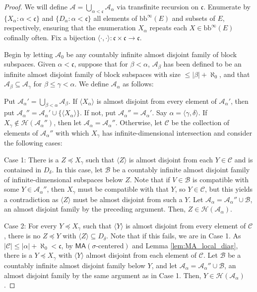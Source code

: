 \documentclass[11pt]{amsart}
\newcommand{\LC}{\mathcal{C}}
\newcommand{\LA}{\mathcal{A}}
\newcommand{\LB}{\mathcal{B}}
\theoremstyle{definition}
\theoremstyle{remark}
\newcommand{\LH}{\mathcal{H}}
\newcommand{\MA}{\mathsf{MA}}
\newcommand{\bb}{\mathrm{bb}}
\renewcommand{\1}{\mathbf{1}}
\newcommand{\cc}{\mathfrak{c}}
\begin{document}
\begin{proof}
	We will define $\LA=\bigcup_{\alpha<\cc}\LA_\alpha$ via transfinite recursion on $\cc$. Enumerate by $\{X_\alpha:\alpha<\cc\}$ and $\{D_\alpha:\alpha<\cc\}$ all elements of $\bb^\infty(E)$ and subsets of $E$, respectively, ensuring that the enumeration $X_\alpha$ repeats each $X\in\bb^\infty(E)$ cofinally often. Fix a bijection $\langle\cdot,\cdot\rangle:\cc\times\cc\to\cc$. 
	
	Begin by letting $\LA_0$ be any countably infinite almost disjoint family of block subspaces. Given $\alpha<\cc$, suppose that for $\beta<\alpha$, $\LA_\beta$ has been defined to be an infinite almost disjoint family of block subspaces with size $\leq|\beta|+\aleph_0$, and that $\LA_\beta\subseteq\LA_\gamma$ for $\beta\leq\gamma<\alpha$. We define $\LA_\alpha$ as follows:
	
	Put $\LA_\alpha'=\bigcup_{\beta<\alpha}\LA_\beta$. If $\langle X_\alpha\rangle$ is almost disjoint from every element of $\LA_\alpha'$, then put $\LA_\alpha''=\LA_\alpha'\cup\{\langle X_\alpha\rangle\}$. If not, put $\LA_\alpha''=\LA_\alpha'$. Say $\alpha=\langle\gamma,\delta\rangle$. If $X_\gamma\notin\LH(\LA_\alpha'')$, then let $\LA_\alpha=\LA_\alpha''$. Otherwise, let $\LC$ be the collection of elements of $\LA_\alpha''$ with which $X_\gamma$ has infinite-dimensional intersection and consider the following cases:
	
	Case 1: There is a $Z\preceq X_\gamma$ such that $\langle Z\rangle$ is almost disjoint from each $Y\in\LC$ and is contained in $D_\delta$. In this case, let $\LB$ be a countably infinite almost disjoint family of infinite-dimensional subspaces below $Z$. Note that if $V\in\LB$ is compatible with some $Y\in\LA_\alpha''$, then $X_\gamma$ must be compatible with that $Y$, so $Y\in\LC$, but this yields a contradiction as $\langle Z\rangle$ must be almost disjoint from such a $Y$. Let $\LA_\alpha=\LA_\alpha''\cup\LB$, an almost disjoint family by the preceding argument. Then, $Z\in\LH(\LA_\alpha)$.
	
	Case 2: For every $Y\preceq X_\gamma$ such that $\langle Y\rangle$ is almost disjoint from every element of $\LC$, there is no $Z\preceq Y$ with $\langle Z\rangle\subseteq D_\delta$. Note that if this fails, we are in Case 1. As $|\LC|\leq|\alpha|+\aleph_0<\cc$, by $\MA(\sigma\text{-centered})$ and Lemma \ref{lem:MA_local_diag}, there is a $Y\preceq X_\gamma$ with $\langle Y\rangle$ almost disjoint from each element of $\LC$. Let $\LB$ be a countably infinite almost disjoint family below $Y$, and let $\LA_\alpha=\LA_\alpha''\cup\LB$, an almost disjoint family by the same argument as in Case 1. Then, $Y\in\LH(\LA_\alpha)$.
	

\end{proof}
\end{document}
